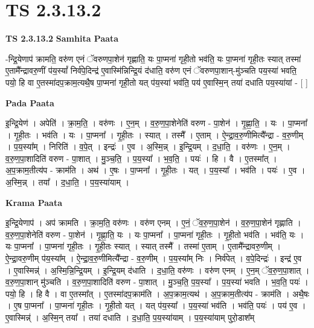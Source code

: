 \documentclass[17pt]{extarticle}
\begin{document}
\section*{ TS 2.3.13.2 }

\textbf{TS 2.3.13.2 } \newline
\textbf{Samhita Paata} \newline

-न्द्रि॒येणाप॑ क्रामति॒ वरु॑ण एनं ॅवरुणपा॒शेन॑ गृह्णाति॒ यः पा॒प्मना॑ गृही॒तो भव॑ति॒ यः पा॒प्मना॑ गृही॒तः स्यात् तस्मा॑ ए॒तामै᳚न्द्रावरु॒णीं प॑य॒स्यां᳚ निर्व॑पे॒दिन्द्र॑ ए॒वास्मि॑न्निन्द्रि॒यं द॑धाति॒ वरु॑ण एनं ॅवरुणपा॒शान्-मु॑ञ्चति पय॒स्या॑ भवति॒ पयो॒ हि वा ए॒तस्मा॑दप॒क्राम॒त्यथै॒ष पा॒प्मना॑ गृही॒तो यत् प॑य॒स्या॑ भव॑ति॒ पय॑ ए॒वास्मि॒न् तया॑ दधाति पय॒स्या॑यां - [  ] \newline

\textbf{Pada Paata} \newline

इ॒न्द्रि॒येण॑ । अपेति॑ । क्रा॒म॒ति॒ । वरु॑णः । ए॒न॒म् । व॒रु॒ण॒पा॒शेनेति॑ वरुण - पा॒शेन॑ । गृ॒ह्णा॒ति॒ । यः । पा॒प्मना᳚ । गृ॒ही॒तः । भव॑ति । यः ।   पा॒प्मना᳚ । गृ॒ही॒तः । स्यात् । तस्मै᳚ । ए॒ताम् । ऐ॒न्द्रा॒व॒रु॒णीमित्यै᳚न्द्रा - व॒रु॒णीम् । प॒य॒स्या᳚म् । निरिति॑ । व॒पे॒त् । इन्द्रः॑ । ए॒व । अ॒स्मि॒न्न् । इ॒न्द्रि॒यम् । द॒धा॒ति॒ । वरु॑णः । ए॒न॒म् । व॒रु॒ण॒पा॒शादिति॑ वरुण - पा॒शात् । मु॒ञ्च॒ति॒ । प॒य॒स्या᳚ । भ॒व॒ति॒ । पयः॑ । हि । वै । ए॒तस्मा᳚त् । अ॒प॒क्राम॒तीत्य॑प - क्राम॑ति । अथ॑ । ए॒षः । पा॒प्मना᳚ । गृ॒ही॒तः । यत् । प॒य॒स्या᳚ । भव॑ति । पयः॑ । ए॒व । अ॒स्मि॒न्न् । तया᳚ । द॒धा॒ति॒ । प॒य॒स्या॑याम् ।  \newline


\textbf{Krama Paata} \newline

इ॒न्द्रि॒येणाप॑ । अप॑ क्रामति । क्रा॒म॒ति॒ वरु॑णः । वरु॑ण एनम् । ए॒नं॒ ॅव॒रु॒ण॒पा॒शेन॑ । व॒रु॒ण॒पा॒शेन॑ गृह्णाति । व॒रु॒ण॒पा॒शेनेति॑ वरुण - पा॒शेन॑ । गृ॒ह्णा॒ति॒ यः । यः पा॒प्मना᳚ । पा॒प्मना॑ गृही॒तः । गृ॒ही॒तो भव॑ति । भव॑ति॒ यः । यः पा॒प्मना᳚ । पा॒प्मना॑ गृही॒तः । गृ॒ही॒तः स्यात् । स्यात् तस्मै᳚ । तस्मा॑ ए॒ताम् । ए॒तामै᳚न्द्रावरु॒णीम् । ऐ॒न्द्रा॒वरु॒णीम् प॑य॒स्या᳚म् । ऐ॒न्द्रा॒व॒रु॒णीमित्यै᳚न्द्रा - व॒रु॒णीम् । प॒य॒स्या᳚म् निः । निर्व॑पेत् । व॒पे॒दिन्द्रः॑ । इन्द्र॑ ए॒व । ए॒वास्मिन्न्॑ । अ॒स्मि॒न्नि॒न्द्रि॒यम् । इ॒न्द्रि॒यम् द॑धाति । द॒धा॒ति॒ वरु॑णः । वरु॑ण एनम् । ए॒न॒म् ॅव॒रु॒ण॒पा॒शात् । व॒रु॒ण॒पा॒शान् मु॑ञ्चति । व॒रु॒ण॒पा॒शादिति॑ वरुण - पा॒शात् । मु॒ञ्च॒ति॒ प॒य॒स्या᳚ । प॒य॒स्या॑ भवति । भ॒व॒ति॒ पयः॑ । पयो॒ हि । हि वै । वा ए॒तस्मा᳚त् । ए॒तस्मा॑दप॒क्राम॑ति । अ॒प॒क्राम॒त्यथ॑ । अ॒प॒क्राम॒तीत्य॑प - क्राम॑ति । अथै॒षः । ए॒ष पा॒प्मना᳚ । पा॒प्मना॑ गृही॒तः । गृ॒ही॒तो यत् । यत् प॑य॒स्या᳚ । प॒य॒स्या॑ भव॑ति । भव॑ति॒ पयः॑ । पय॑ ए॒व । ए॒वास्मिन्न्॑ । अ॒स्मि॒न् तया᳚ । तया॑ दधाति । द॒धा॒ति॒ प॒य॒स्या॑याम् । प॒य॒स्या॑याम् पुरो॒डाश᳚म् \newline
\end{document}
